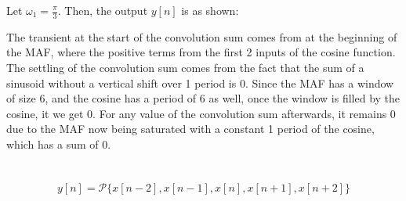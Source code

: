 \documentclass{article}
\begin{document}
Let \(\omega_1 = \frac{\pi}{3}\).
Then, the output \(y[n]\) is as shown:
\begin{center}
\end{center}
The transient at the start of the convolution sum comes from at the beginning of the MAF, where the positive terms from the first 2 inputs of the cosine function.
The settling of the convolution sum comes from the fact that the sum of a sinusoid without a vertical shift over 1 period is 0. Since the MAF has a window of size 6, and the cosine has a period of 6 as well, once the window is filled by the cosine, it we get 0.
For any value of the convolution sum afterwards, it remains 0 due to the MAF now being saturated with a constant 1 period of the cosine, which has a sum of 0.

\newpage
\section{}

\begin{equation}
    y[n] = \mathcal{P}\{x[n - 2], x[n - 1], x[n], x[n + 1], x[n + 2]\}
\end{equation}

\subsection{}
\end{document}
